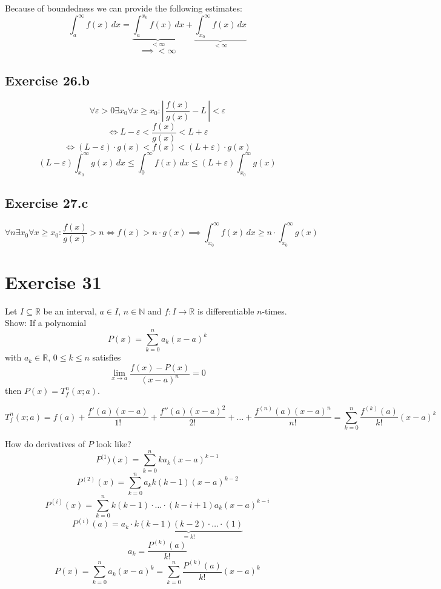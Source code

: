 \documentclass[a4paper]{article}
\theoremstyle{definition}
\newcommand\abs[1]{\left|\,#1\,\right|}
\begin{document}
Because of boundedness we can provide the following estimates:
\[ \int_a^\infty f(x) \, dx = \underbrace{\int_a^{x_0} f(x) \, dx}_{<\infty} + \underbrace{\int_{x_0}^\infty f(x) \, dx}_{< \infty} \]
\[ \implies < \infty \]

\subsection{Exercise 26.b}
\[
  \forall \varepsilon > 0
  \exists x_0
  \forall x \geq x_0:
  \abs{\frac{f(x)}{g(x)} - L} < \varepsilon
\] \[
  \iff L - \varepsilon < \frac{f(x)}{g(x)} < L + \varepsilon
\] \[
  \iff (L - \varepsilon) \cdot g(x) < f(x) < (L + \varepsilon) \cdot g(x)
\] \[
  (L - \varepsilon) \int_{x_0}^\infty g(x) \, dx
  \leq \int_0^\infty f(x) \, dx
  \leq (L + \varepsilon) \int_{x_0}^\infty g(x)
\]

\subsection{Exercise 27.c}
\[
  \forall n \exists x_0 \forall x \geq x_0:
  \frac{f(x)}{g(x)} > n
  \iff f(x) > n \cdot g(x)
  \implies \int_{x_0}^\infty f(x) \, dx \geq n \cdot \int_{x_0}^\infty g(x)
\]

\section{Exercise 31}
\begin{ex}
  Let $I \subseteq \mathbb R$ be an interval, $a \in I$, $n \in \mathbb N$
  and $f: I \to \mathbb R$ is differentiable $n$-times.
  Show: If a polynomial
  \[ P(x) = \sum_{k=0}^{n} a_k(x - a)^k \]
  with $a_k \in \mathbb R$, $0 \leq k \leq n$ satisfies
  \[ \lim_{x\to a} \frac{f(x) - P(x)}{(x - a)^n} = 0 \]
  then $P(x) = T_f^n(x;a)$.
\end{ex}

\[
T_f^n(x;a) = f(a) + \frac{f'(a)(x - a)}{1!} + \frac{f''(a)(x - a)^2}{2!} + \ldots + \frac{f^{(n)}(a)(x - a)^n}{n!}
= \sum_{k=0}^n \frac{f^{(k)}(a)}{k!} (x - a)^k
\]

How do derivatives of $P$ look like?
\[ P^{(1})(x) = \sum_{k=0}^n k a_k (x - a)^{k-1} \]
\[ P^{(2)}(x) = \sum_{k=0}^n a_k k (k - 1) (x - a)^{k-2} \]
\[ P^{(i)}(x) = \sum_{k=0}^n k (k-1) \cdot \ldots \cdot (k - i + 1) a_k (x - a)^{k-i}  \]
\[ P^{(i)}(a) = a_k \cdot \underbrace{k (k-1) (k-2) \cdot \ldots \cdot (1)}_{=k!} \]
\[ a_k = \frac{P^{(k)}(a)}{k!} \]
\[ P(x) = \sum_{k=0}^n a_k (x - a)^k = \sum_{k=0}^n \frac{P^{(k)}(a)}{k!} (x - a)^k \]
\end{document}
